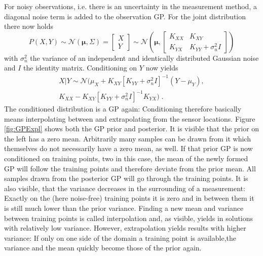 \documentclass[%
  a4paper,oneside,%
  11pt,%
  smallchapters,
  style=printdev,
  extramargin,
  green,%
  rgb, <cmyk>
  ]{tubsbook}
\begin{document}
For noisy observations, i.e. there is an uncertainty in the measurement method, a diagonal noise term is added to the observation GP. For the joint distribution there now holds
\begin{equation}
P(X,Y) \sim \mathcal{N}(\bm{\mu},\Sigma) = \begin{bmatrix}
           X \\
           Y
         \end{bmatrix} \sim \mathcal{N}\left( \bm{\mu}, \begin{bmatrix}
K_{XX} & K_{XY} \\
K_{YX} & K_{YY} + \sigma_n^2 I 
\end{bmatrix}  \right)
\label{eqn:noiseJoint}
\end{equation}
with $\sigma_n^2$ the variance of an independent and identically distributed Gaussian noise and $I$ the identity matrix. Conditioning on $Y$ now yields
\begin{equation}
\begin{aligned}
X|Y \sim \mathcal{N}(\mu_X +K_{XY} [K_{YY}+ \sigma_n^2 I ]^{-1}(Y-\mu_Y), \\
K_{XX} - K_{XY}[K_{YY}+ \sigma_n^2 I ]^{-1}K_{YX} ) \;.
\end{aligned}
\label{eqn:ConditioningDistr}
\end{equation}
The conditioned distribution is a GP again: Conditioning therefore basically means interpolating between and extrapolating from the sensor locations. \cite{damianou2021}
%
%
Figure \ref{fig:GPExpl} shows both the GP prior and posterior. It is visible that the prior on the left has a zero mean. Arbitrarily many samples can be drawn from it which themselves do not necessarily have a zero mean, as well. If that prior GP is now conditioned on training points, two in this case, the mean of the newly formed GP will follow the training points and therefore deviate from the prior mean. All samples drawn from the posterior GP will go through the training points.  It is also visible, that the variance decreases in the surrounding of a measurement: Exactly on the (here noise-free) training points it is zero and in between them it is still much lower than the prior variance. Finding a new mean and variance between training points is called interpolation and, as visible, yields in solutions with relatively low variance. However, extrapolation yields results with higher variance: If only on one side of the domain a training point is available,the variance and the mean quickly become those of the prior again.
\end{document}
